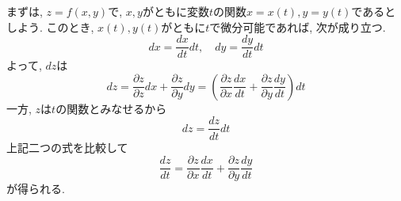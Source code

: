 \documentclass[a4j,dvipdfmx]{jsarticle}
\numberwithin{equation}{section}
\begin{document}
            まずは, $z=f(x,y)$で, $x,y$がともに変数$t$の関数$x=x(t),y=y(t)$であるとしよう. このとき, $x(t),y(t)$がともに$t$で微分可能であれば, 次が成り立つ.
            \begin{equation*}
                dx=\frac{dx}{dt}dt,\quad dy=\frac{dy}{dt}dt
            \end{equation*}
            よって, $dz$は
            \begin{equation*}
                dz = \frac{\partial z}{\partial z}dx+\frac{\partial z}{\partial y}dy=\left(\frac{\partial z}{\partial x}\frac{dx}{dt}+\frac{\partial z}{\partial y}\frac{dy}{dt}\right)dt
            \end{equation*}
            一方, $z$は$t$の関数とみなせるから
            \begin{equation*}
                dz=\frac{dz}{dt}dt
            \end{equation*}
            上記二つの式を比較して
            \begin{equation}
                \frac{dz}{dt}=\frac{\partial z}{\partial x}\frac{dx}{dt}+\frac{\partial z}{\partial y}\frac{dy}{dt} \label{eq:偏微分:合成関数の微分t}
            \end{equation}
            が得られる. \\
\end{document}
